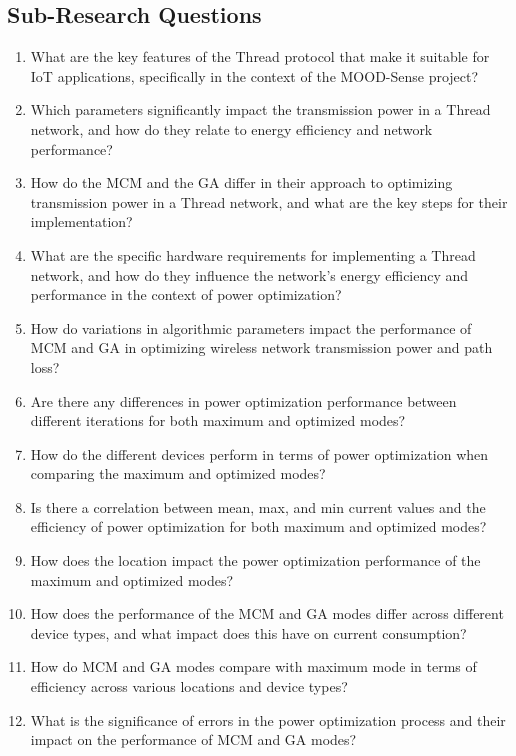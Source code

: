 \subsection*{Sub-Research Questions}
\begin{enumerate}
    \item What are the key features of the Thread protocol that make it suitable for \gls{IoT} applications, specifically in the context of the MOOD-Sense project?
    \item Which parameters significantly impact the transmission power in a Thread network, and how do they relate to energy efficiency and network performance?
    \item How do the \gls{MCM} and the \gls{GA} differ in their approach to optimizing transmission power in a Thread network, and what are the key steps for their implementation?
    \item What are the specific hardware requirements for implementing a Thread network, and how do they influence the network's energy efficiency and performance in the context of power optimization?
    \item How do variations in algorithmic parameters impact the performance of \gls{MCM} and \gls{GA} in optimizing wireless network transmission power and path loss?
    \item Are there any differences in power optimization performance between different iterations for both maximum and optimized modes?
    \item How do the different devices perform in terms of power optimization when comparing the maximum and optimized modes?
    \item Is there a correlation between mean, max, and min current values and the efficiency of power optimization for both maximum and optimized modes?
    \item How does the location impact the power optimization performance of the maximum and optimized modes?
    \item How does the performance of the \gls{MCM} and \gls{GA} modes differ across different device types, and what impact does this have on current consumption?
    \item How do \gls{MCM} and \gls{GA} modes compare with maximum mode in terms of efficiency across various locations and device types?
    \item What is the significance of errors in the power optimization process and their impact on the performance of \gls{MCM} and \gls{GA} modes?
\end{enumerate}


